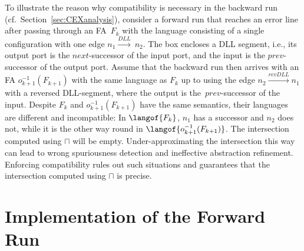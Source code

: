 {To illustrate the reason why compatibility is necessary in the backward run (cf.\
Section~\ref{sec:CEXanalysis}), consider a forward run that reaches an error
line after passing through an FA~$F_k$ with the language consisting of a single configuration
with one edge $n_1 \xrightarrow {\mathit{DLL}}~n_2$.
% 
%
The box encloses a DLL segment, i.e., its output port
is the $\mathit{next}$-successor of the input port, and the input is the
$\mathit{prev}$-successor of the output port. 
%
Assume that the backward run then arrives with an FA
$o_{k+1}^{-1}({F_{k+1}})$ with the same language as $F_k$ up to 
using the edge $n_2 \xrightarrow {\mathit{revDLL}} n_1$
%
%
with a reversed DLL-segment, where the output is the~$\mathit{prev}$-successor of the input.
%
Despite $F_k$ and
$o_{k+1}^{-1}({F_{k+1}})$ have the same semantics,
%
%
their languages are different and incompatible:
In $\langof{F_k}$, $n_1$ has a successor and $n_2$ does not, 
while it is the other way round in $\langof{o_{k+1}^{-1}({F_{k+1}})}$.
%
The intersection computed using $\sqcap$ will be empty.
%
%
Under-approximating the intersection this way can lead to
wrong spuriousness detection and ineffective abstraction refinement.
%
Enforcing compatibility rules out such situations and guarantees that the
intersection computed using $\sqcap$ is precise.


\section{Implementation of the Forward Run}\label{sec:fwd_run}

}
